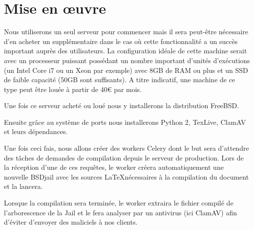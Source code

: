 \documentclass[10pt,a4paper]{article}
\begin{document}
\section{Mise en œuvre}

Nous utiliserons un seul serveur pour commencer mais il sera peut-être nécessaire d'en acheter un supplémentaire dans le cas où cette fonctionnalité a un succès important auprès des utilisateurs.
La configuration idéale de cette machine serait avec un processeur puissant possédant un nombre important d'unités d'exécutions (un Intel Core i7 ou un Xeon par exemple) avec 8GB de RAM ou plus et un SSD de faible capacité (50GB sont suffisants).
A titre indicatif, une machine de ce type peut être louée à partir de 40\euro { }par mois.

Une fois ce serveur acheté ou loué nous y installerons la distribution FreeBSD.

Ensuite grâce au système de ports nous installerons Python 2, TexLive, ClamAV et leurs dépendances.


Une fois ceci fais, nous allons créer des workers Celery dont le but sera d'attendre des tâches de demandes de compilation depuis le serveur de production.
Lors de la réception d'une de ces requêtes, le worker créera automatiquement une nouvelle BSDjail avec les sources \LaTeX nécessaires à la compilation du document et la lancera.

Lorsque la compilation sera terminée, le worker extraira le fichier compilé de l'arborescence de la Jail et le fera analyser par un antivirus (ici ClamAV) afin d'éviter d'envoyer des maliciels à nos clients.
\end{document}
